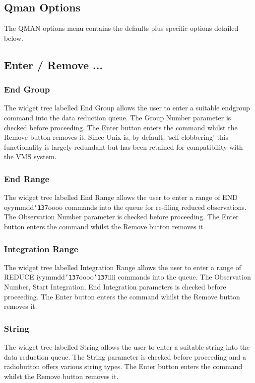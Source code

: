 \documentclass[a4paper]{book}
\renewcommand{\_}{{\tt\char'137}}
\begin{document}
\subsection{Qman Options}
The QMAN options menu contains the defaults plus specific options detailed below.

\subsection{Enter / Remove ...}
\subsubsection{End Group}
The widget tree labelled {\sf End Group} allows the user to enter a suitable
endgroup command into the data reduction queue. The {\sf Group Number} parameter
is checked before proceeding. The {\sf Enter} button enters the command whilst the
{\sf Remove} button removes it. Since Unix is, by default, `self-clobbering' this
functionality is largely redundant but has been retained for compatibility with the
VMS system. 

\subsubsection{End Range}
The widget tree labelled {\sf End Range} allows the user to enter a range of
END oyymmdd\_oooo commands into the queue for re-filing reduced observations.
The {\sf Observation Number} parameter is checked before proceeding. The {\sf Enter} 
button enters the command whilst the {\sf Remove} button removes it. 

\subsubsection{Integration Range}
The widget tree labelled {\sf Integration Range} allows the user to enter a range
of REDUCE iyymmdd\_oooo\_iiii commands into the queue.
The {\sf Observation Number, Start Integration, End Integration} parameters
is checked before proceeding. The {\sf Enter} button enters the command whilst the
{\sf Remove} button removes it. 

\subsubsection{String}
The widget tree labelled {\sf String} allows the user to enter a suitable
string into the data reduction queue. The {\sf String} parameter
is checked before proceeding and a radiobutton offers various string types. 
The {\sf Enter} button enters the command whilst the {\sf Remove} button removes it. 
\end{document}
